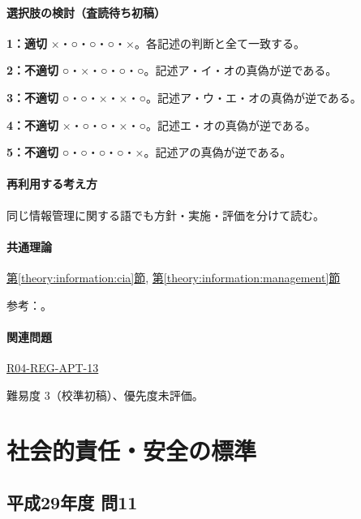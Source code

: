 \paragraph{選択肢の検討（査読待ち初稿）}\mbox{}\par

\noindent\textbf{1：適切} ×・○・○・○・×。各記述の判断と全て一致する。\par

\noindent\textbf{2：不適切} ○・×・○・○・○。記述ア・イ・オの真偽が逆である。\par

\noindent\textbf{3：不適切} ○・○・×・×・○。記述ア・ウ・エ・オの真偽が逆である。\par

\noindent\textbf{4：不適切} ×・○・○・×・○。記述エ・オの真偽が逆である。\par

\noindent\textbf{5：不適切} ○・○・○・○・×。記述アの真偽が逆である。\par

\paragraph{再利用する考え方} 同じ情報管理に関する語でも方針・実施・評価を分けて読む。

\paragraph{共通理論} \hyperref[theory:information:cia]{第\ref*{theory:information:cia}節}, \hyperref[theory:information:management]{第\ref*{theory:information:management}節}

\par 参考：\cite{iso27000_2009}。

\paragraph{関連問題} \hyperref[q:r04-reg-apt-13]{R04-REG-APT-13}

\par 難易度 3（校準初稿）、優先度未評価。

\section{社会的責任・安全の標準}

\subsection{平成29年度 問11}
\label{q:h29-reg-apt-11}

